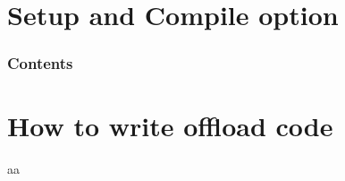\documentclass[dvipdfmx, 11pt, aspectratio=169]{beamer}   %
\begin{document}
\section{Setup and Compile option}
\begin{frame}
    \frametitle{Contents}
    \tableofcontents[currentsection]
\end{frame}
\begin{frame}{}

\end{frame}
\section{How to write offload code}
\begin{frame}{aa}

\end{frame}
\end{document}
